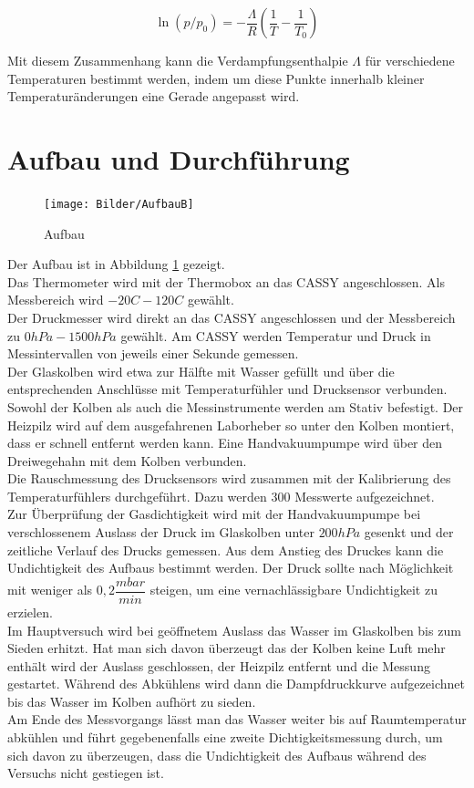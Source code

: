 \documentclass[12pt,a4paper]{article}
\begin{document}
\begin{equation}
\ln{(p/p_0)}=-\frac{\Lambda}{R} \left(\frac{1}{T}-			\frac{1}{T_0}\right)
\end{equation}

Mit diesem Zusammenhang kann die Verdampfungsenthalpie $\Lambda$ für verschiedene Temperaturen bestimmt werden, indem um diese Punkte innerhalb kleiner Temperaturänderungen eine Gerade angepasst wird.

\section{Aufbau und Durchführung}
\begin{figure}
\texttt{[image: Bilder/AufbauB]}
\caption[AufbauB]{Aufbau}
\label{fig:AufbauB}
\end{figure}

Der Aufbau ist in Abbildung \ref{fig:AufbauB} gezeigt. \\
Das Thermometer wird mit der Thermobox an das CASSY angeschlossen. Als Messbereich wird $-20C - 120C$ gewählt.\\
Der Druckmesser wird direkt an das CASSY angeschlossen und der Messbereich zu $0hPa - 1500hPa$ gewählt. Am CASSY werden Temperatur und Druck in Messintervallen von jeweils einer Sekunde gemessen. \\

Der Glaskolben wird etwa zur Hälfte mit Wasser gefüllt und über die entsprechenden Anschlüsse mit Temperaturfühler und Drucksensor verbunden. Sowohl der Kolben als auch die Messinstrumente werden am Stativ befestigt. Der Heizpilz wird auf dem ausgefahrenen Laborheber so unter den Kolben montiert, dass er schnell entfernt werden kann. Eine Handvakuumpumpe wird über den Dreiwegehahn mit dem Kolben verbunden.\\

Die Rauschmessung des Drucksensors wird zusammen mit der Kalibrierung des Temperaturfühlers durchgeführt. Dazu werden $300$ Messwerte aufgezeichnet.\\
Zur Überprüfung der Gasdichtigkeit wird mit der Handvakuumpumpe bei verschlossenem Auslass der Druck im Glaskolben unter $200hPa$ gesenkt und der zeitliche Verlauf des Drucks gemessen. Aus dem Anstieg des Druckes kann die Undichtigkeit des Aufbaus bestimmt werden. Der Druck sollte nach Möglichkeit mit weniger als $0,2 \dfrac{mbar}{min}$ steigen, um eine vernachlässigbare Undichtigkeit zu erzielen. \\

Im Hauptversuch wird bei geöffnetem Auslass das Wasser im Glaskolben bis zum Sieden erhitzt. Hat man sich davon überzeugt das der Kolben keine Luft mehr enthält wird der Auslass geschlossen, der Heizpilz entfernt und die Messung gestartet. Während des Abkühlens wird dann die Dampfdruckkurve aufgezeichnet bis das Wasser im Kolben aufhört zu sieden.\\
Am Ende des Messvorgangs lässt man das Wasser weiter bis auf Raumtemperatur abkühlen und führt gegebenenfalls eine zweite Dichtigkeitsmessung durch, um sich davon zu überzeugen, dass die Undichtigkeit des Aufbaus während des Versuchs nicht gestiegen ist. 
\end{document}
